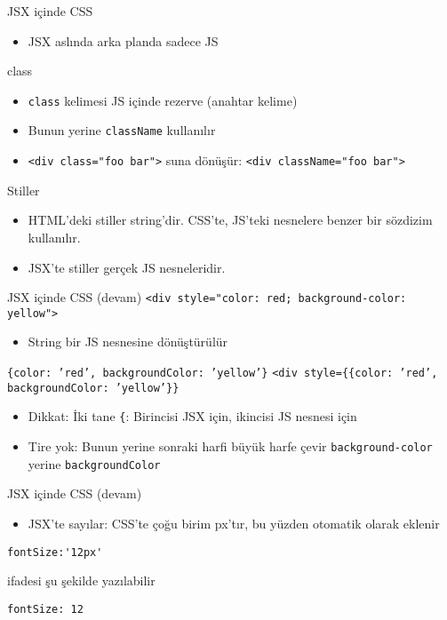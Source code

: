 \documentclass[presentation]{beamer}
\begin{document}
\begin{frame}[fragile,label={sec:orgb7885e7}]{JSX içinde CSS}
 \begin{itemize}
\item JSX aslında arka planda sadece JS
\end{itemize}
\begin{block}{class}
\begin{itemize}
\item \texttt{class} kelimesi JS içinde rezerve (anahtar kelime)
\item Bunun yerine \texttt{className} kullanılır
\item \texttt{<div class="foo bar">} suna dönüşür:  \texttt{<div className="foo bar">}
\end{itemize}
\end{block}
\begin{block}{Stiller}
\begin{itemize}
\item HTML'deki stiller string'dir. CSS'te, JS'teki nesnelere benzer bir sözdizim
kullanılır.
\item JSX'te stiller gerçek JS nesneleridir.
\end{itemize}
\end{block}
\end{frame}

\begin{frame}[fragile,label={sec:org4a5c0b6}]{JSX içinde CSS (devam)}
 \texttt{<div style="color: red; background-color: yellow">}
\begin{itemize}
\item String bir JS nesnesine dönüştürülür
\end{itemize}
\texttt{\{color: 'red', backgroundColor: 'yellow'\}}
\texttt{<div style=\{\{color: 'red', backgroundColor: 'yellow'\}\}}
\begin{itemize}
\item Dikkat: İki tane \texttt{\{}: Birincisi JSX için, ikincisi JS nesnesi için
\item Tire yok: Bunun yerine sonraki harfi büyük harfe çevir
\texttt{background-color} yerine \texttt{backgroundColor}
\end{itemize}
\end{frame}

\begin{frame}[fragile,label={sec:org04a4418}]{JSX içinde CSS (devam)}
 \begin{itemize}
\item JSX'te sayılar: CSS'te çoğu birim px'tır, bu yüzden otomatik olarak eklenir
\end{itemize}
\begin{verbatim}
fontSize:'12px'
\end{verbatim}
ifadesi şu şekilde yazılabilir
\begin{verbatim}
fontSize: 12
\end{verbatim}
\end{frame}
\end{document}
